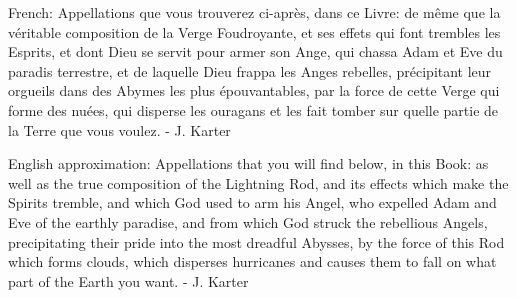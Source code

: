 French: Appellations que vous trouverez ci-après, dans ce Livre: de même que la véritable composition de la Verge Foudroyante, et ses effets qui font trembles les Esprits, et dont Dieu se servit pour armer son Ange, qui chassa Adam et Eve du paradis terrestre, et de laquelle Dieu frappa les Anges rebelles, précipitant leur orgueils dans des Abymes les plus épouvantables, par la force de cette Verge qui forme des nuées, qui disperse les ouragans et les fait tomber sur quelle partie de la Terre que vous voulez.
- J. Karter

English approximation: Appellations that you will find below, in this Book: as well as the true composition of the Lightning Rod, and its effects which make the Spirits tremble, and which God used to arm his Angel, who expelled Adam and Eve of the earthly paradise, and from which God struck the rebellious Angels, precipitating their pride into the most dreadful Abysses, by the force of this Rod which forms clouds, which disperses hurricanes and causes them to fall on what part of the Earth you want.
- J. Karter
